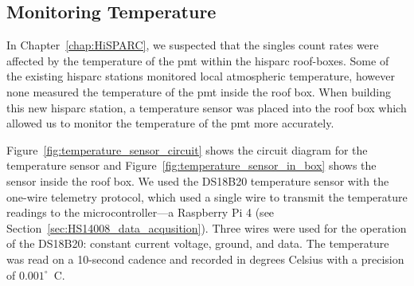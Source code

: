 \subsection{Monitoring Temperature}

In Chapter~\ref{chap:HiSPARC}, we suspected that the singles count rates were affected by the temperature of the \gls{pmt} within the \gls{hisparc} roof-boxes. Some of the existing \gls{hisparc} stations monitored local atmospheric temperature, however none measured the temperature of the \gls{pmt} inside the roof box. When building this new \gls{hisparc} station, a temperature sensor was placed into the roof box which allowed us to monitor the temperature of the \gls{pmt} more accurately. %

Figure~\ref{fig:temperature_sensor_circuit} shows the circuit diagram for the temperature sensor and Figure~\ref{fig:temperature_sensor_in_box} shows the sensor inside the roof box. We used the DS18B20 temperature sensor with the one-wire telemetry protocol, which used a single wire to transmit the temperature readings to the microcontroller---a Raspberry Pi 4 (see Section~\ref{sec:HS14008_data_acqusition}). Three wires were used for the operation of the DS18B20: constant current voltage, ground, and data. The temperature was read on a 10-second cadence and recorded in degrees Celsius with a precision of $0.001^{\circ}$~C. 

